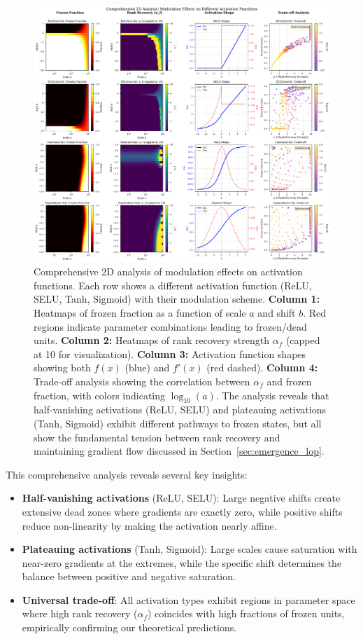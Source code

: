 \documentclass{article}
\numberwithin{figure}{section}
\begin{document}
\begin{figure}[ht!]
    \centering
    \includegraphics[width=\linewidth]{validation_modulation_2d_comprehensive.pdf}
    \caption{Comprehensive 2D analysis of modulation effects on activation functions. Each row shows a different activation function (ReLU, SELU, Tanh, Sigmoid) with their modulation scheme. \textbf{Column 1:} Heatmaps of frozen fraction as a function of scale $a$ and shift $b$. Red regions indicate parameter combinations leading to frozen/dead units. \textbf{Column 2:} Heatmaps of rank recovery strength $\alpha_f$ (capped at 10 for visualization). \textbf{Column 3:} Activation function shapes showing both $f(x)$ (blue) and $f'(x)$ (red dashed). \textbf{Column 4:} Trade-off analysis showing the correlation between $\alpha_f$ and frozen fraction, with colors indicating $\log_{10}(a)$. The analysis reveals that half-vanishing activations (ReLU, SELU) and plateauing activations (Tanh, Sigmoid) exhibit different pathways to frozen states, but all show the fundamental tension between rank recovery and maintaining gradient flow discussed in Section~\ref{sec:emergence_lop}.}
    \label{fig:validation_modulation_2d_comprehensive}
\end{figure}

This comprehensive analysis reveals several key insights:
\begin{itemize}
    \item \textbf{Half-vanishing activations} (ReLU, SELU): Large negative shifts create extensive dead zones where gradients are exactly zero, while positive shifts reduce non-linearity by making the activation nearly affine.
    \item \textbf{Plateauing activations} (Tanh, Sigmoid): Large scales cause saturation with near-zero gradients at the extremes, while the specific shift determines the balance between positive and negative saturation.
    \item \textbf{Universal trade-off}: All activation types exhibit regions in parameter space where high rank recovery ($\alpha_f$) coincides with high fractions of frozen units, empirically confirming our theoretical predictions.
\end{itemize}
\end{document}
